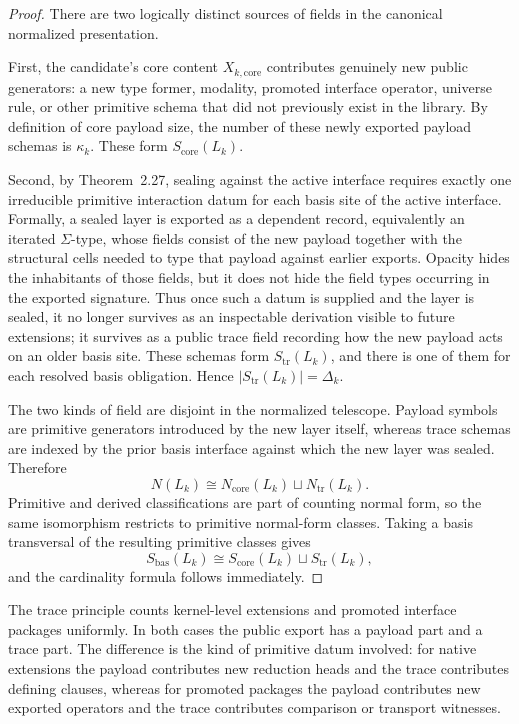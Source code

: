 \documentclass{lmcs}
\begin{document}
\begin{proof}
There are two logically distinct sources of fields in the canonical normalized presentation.

First, the candidate's core content \(X_{k,\mathrm{core}}\) contributes genuinely new public
generators: a new type former, modality, promoted interface operator, universe rule, or
other primitive schema that did not previously exist in the library.  By definition of core
payload size, the number of these newly exported payload schemas is \(\kappa_k\).  These
form \(S_{\mathrm{core}}(L_k)\).

Second, by Theorem~2.27, sealing against the active interface requires exactly one irreducible
primitive interaction datum for each basis site of the active interface.  Formally, a sealed
layer is exported as a dependent record, equivalently an iterated \(\Sigma\)-type, whose fields
consist of the new payload together with the structural cells needed to type that payload
against earlier exports.  Opacity hides the inhabitants of those fields, but it does not hide
the field types occurring in the exported signature.  Thus once such a datum is supplied and
the layer is sealed, it no longer survives as an inspectable derivation visible to future
extensions; it survives as a public trace field recording how the new payload acts on an older
basis site.  These schemas form \(S_{\mathrm{tr}}(L_k)\), and there is one of them for each
resolved basis obligation.  Hence \(|S_{\mathrm{tr}}(L_k)|=\Delta_k\).

The two kinds of field are disjoint in the normalized telescope.  Payload symbols are
primitive generators introduced by the new layer itself, whereas trace schemas are indexed by
the prior basis interface against which the new layer was sealed.  Therefore
\[
  N(L_k) \cong N_{\mathrm{core}}(L_k) \sqcup N_{\mathrm{tr}}(L_k).
\]
Primitive and derived classifications are part of counting normal form, so the same isomorphism
restricts to primitive normal-form classes.  Taking a basis transversal of the resulting
primitive classes gives
\[
  S_{\mathrm{bas}}(L_k) \cong S_{\mathrm{core}}(L_k) \sqcup S_{\mathrm{tr}}(L_k),
\]
and the cardinality formula follows immediately.
\end{proof}

\begin{rem}
The trace principle counts kernel-level extensions and promoted interface packages
uniformly.  In both cases the public export has a payload part and a trace part.  The
difference is the kind of primitive datum involved: for native extensions the payload
contributes new reduction heads and the trace contributes defining clauses, whereas for
promoted packages the payload contributes new exported operators and the trace contributes
comparison or transport witnesses.
\end{rem}
\end{document}
